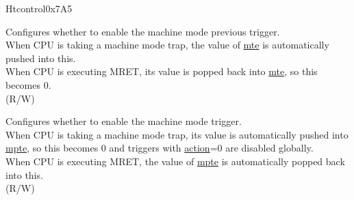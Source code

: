 \begin{register}{H}{tcontrol}{0x7A5}\label{regdesc:TCONTROL}
%
%
%
%
\regnewline%
\begin{regdesc}\begin{reglist}
\label{fielddesc:TCONTROLMPTE}\item [mpte] Configures whether to enable the machine mode previous trigger.\\
When CPU is taking a machine mode trap, the value of \hyperref[fielddesc:TCONTROLMTE]{mte} is automatically pushed into this.\\
When CPU is executing MRET, its value is popped back into \hyperref[fielddesc:TCONTROLMTE]{mte}, so this becomes 0.\\
(R/W)
\label{fielddesc:TCONTROLMTE}\item [mte] Configures whether to enable the machine mode trigger.\\
When CPU is taking a machine mode trap, its value is automatically pushed into \hyperref[fielddesc:TCONTROLMPTE]{mpte}, so this becomes 0 and triggers with \hyperref[fielddesc:MCONTROLACTION]{action}=0 are disabled globally.\\
When CPU is executing MRET, the value of \hyperref[fielddesc:TCONTROLMPTE]{mpte} is automatically popped back into this.\\
(R/W)
\end{reglist}\end{regdesc}
\end{register}

